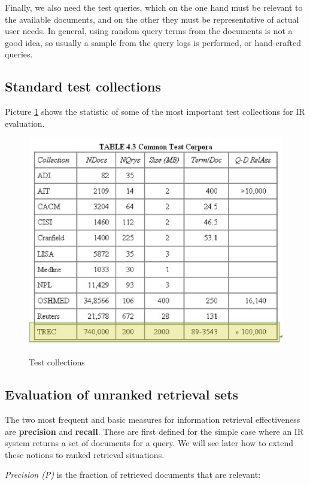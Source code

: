 Finally, we also need the test queries, which on the one hand must be relevant to the available documents, and on the other they must be representative of actual user needs. In general, using random query terms from the documents is not a good idea, so usually a sample from the query logs is performed, or hand-crafted queries.

\subsection{Standard test collections}
Picture \ref{tc} shows the statistic of some of the most important test collections for IR evaluation.

\begin{figure}[h!]
		\centering
		\includegraphics[scale = 1.8]{img/test collection.jpg}
		\label{tc}
        \caption{Test collections}
\end{figure}

\subsection{Evaluation of unranked retrieval sets}
The two most frequent and basic measures for information retrieval effectiveness are \textbf{precision} and \textbf{recall}. These are first defined for the simple case where an IR system returns a set of documents for a query. We will see later how to extend these notions to ranked retrieval situations.

\textit{Precision (P)} is the fraction of retrieved documents that are relevant:

